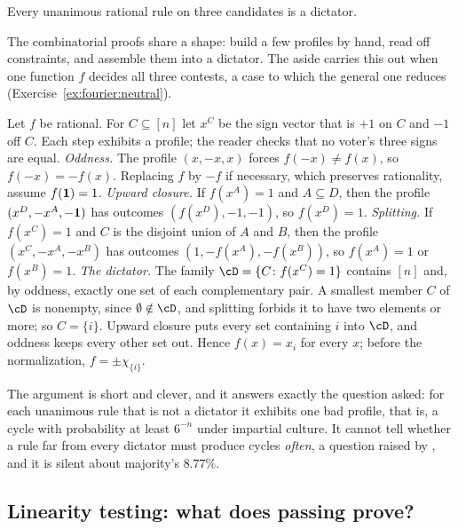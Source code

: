 \begin{refsection}
\begin{theorem}\label{thm:fourier:arrow}
Every unanimous rational rule on three candidates is a dictator.
\end{theorem}

The combinatorial proofs share a shape: build a few profiles by hand, read off constraints, and assemble them into a dictator. The aside carries this out when one function $f$ decides all three contests, a case to which the general one reduces (Exercise~\ref{ex:fourier:neutral}).

\begin{aside}
Let $f$ be rational. For $C\subseteq[n]$ let $x^C$ be the sign vector that is $+1$ on $C$ and $-1$ off $C$. Each step exhibits a profile; the reader checks that no voter's three signs are equal.
\emph{Oddness.} The profile $(x,-x,x)$ forces $f(-x)\ne f(x)$, so $f(-x)=-f(x)$. Replacing $f$ by $-f$ if necessary, which preserves rationality, assume $f(\mathbf{1})=1$.
\emph{Upward closure.} If $f(x^A)=1$ and $A\subseteq D$, then the profile $(x^D,-x^A,-\mathbf{1})$ has outcomes $(f(x^D),-1,-1)$, so $f(x^D)=1$.
\emph{Splitting.} If $f(x^C)=1$ and $C$ is the disjoint union of $A$ and $B$, then the profile $(x^C,-x^A,-x^B)$ has outcomes $(1,-f(x^A),-f(x^B))$, so $f(x^A)=1$ or $f(x^B)=1$.
\emph{The dictator.} The family $\cD=\{C\colon f(x^C)=1\}$ contains $[n]$ and, by oddness, exactly one set of each complementary pair. A smallest member $C$ of $\cD$ is nonempty, since $\emptyset\notin\cD$, and splitting forbids it to have two elements or more; so $C=\{i\}$. Upward closure puts every set containing $i$ into $\cD$, and oddness keeps every other set out. Hence $f(x)=x_i$ for every $x$; before the normalization, $f=\pm\chi_{\{i\}}$.
\end{aside}

The argument is short and clever, and it answers exactly the question asked: for each unanimous rule that is not a dictator it exhibits one bad profile, that is, a cycle with probability at least $6^{-n}$ under impartial culture. It cannot tell whether a rule far from every dictator must produce cycles \emph{often}, a question raised by \textcite{Kalai2002}, and it is silent about majority's $8.77\%$.

\subsection{Linearity testing: what does passing prove?}\label{sec:fourier:blr}


\end{refsection}
